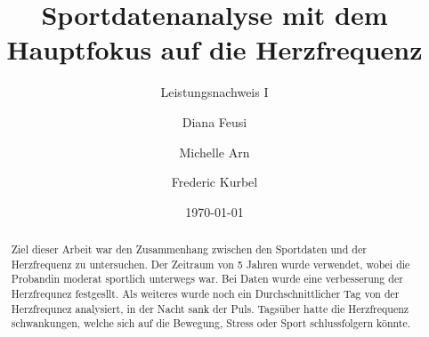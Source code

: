 

\titlehead{BSc Computational and Data Science\\CDS Data Scinece\\Dozent: Prof. Corsin Capol\hfill}
\title{Sportdatenanalyse mit dem Hauptfokus auf die Herzfrequenz}
\subtitle{Leistungsnachweis I}
\author[1,*]{Diana Feusi}
\author[1,*]{Michelle Arn}
\author[1,*]{Frederic Kurbel}
\date{\today}
\maketitle

\begin{abstract}
Ziel dieser Arbeit war den Zusammenhang zwischen den Sportdaten und der Herzfrequenz zu untersuchen. Der Zeitraum von 5 Jahren wurde verwendet, wobei die Probandin moderat sportlich unterwegs war. Bei Daten wurde eine verbesserung der Herzfrequnez festgesllt. Als weiteres wurde noch ein Durchschnittlicher Tag von der Herzfrequnez analysiert, in der Nacht sank der Puls. Tagsüber hatte die Herzfrequenz schwankungen, welche sich auf die Bewegung, Stress oder Sport schlussfolgern könnte.
\end{abstract}
